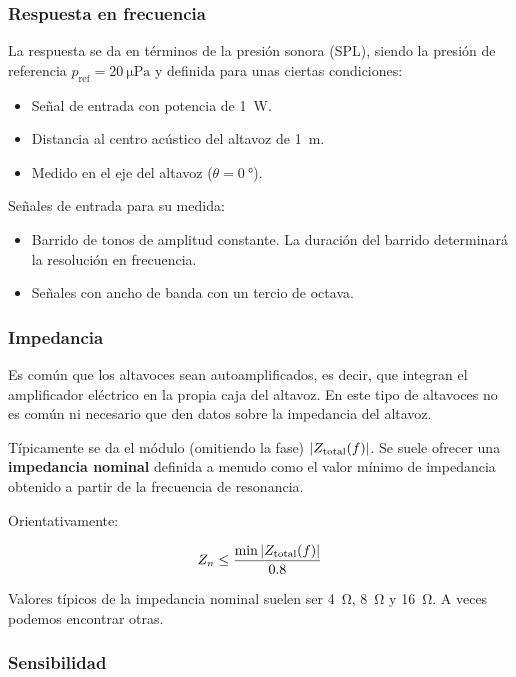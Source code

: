 \documentclass[12pt, a4paper]{article}
\begin{document}
\subsubsection{Respuesta en frecuencia}

La respuesta se da en términos de la presión sonora (SPL), siendo la presión de referencia $p _{\text{ref}} = \qty{20}{\micro\pascal}$ y definida para unas ciertas condiciones:
\begin{itemize}
    \item Señal de entrada con potencia de \qty{1}{\watt}.
    \item Distancia al centro acústico del altavoz de \qty{1}{\meter}.
    \item Medido en el eje del altavoz ($\theta = \qty{0}{\degree}$).
\end{itemize}

Señales de entrada para su medida:
\begin{itemize}
    \item Barrido de tonos de amplitud constante. La duración del barrido determinará la resolución en frecuencia.
    \item Señales con ancho de banda con un tercio de octava.
\end{itemize}

\subsubsection{Impedancia}

Es común que los altavoces sean autoamplificados, es decir, que integran el amplificador eléctrico en la propia caja del altavoz. En este tipo de altavoces no es común ni necesario que den datos sobre la impedancia del altavoz.

Típicamente se da el módulo (omitiendo la fase) $\abs{Z _{\text{total}}(f)}$. Se suele ofrecer una \textbf{impedancia nominal} definida a menudo como el valor mínimo de impedancia obtenido a partir de la frecuencia de resonancia.

Orientativamente:

\begin{equation} \label{eq:impedancia_nominal}
    Z _n \leq \frac{\min \abs{ Z _{\text{total}}(f)} }{0.8}
\end{equation}

Valores típicos de la impedancia nominal suelen ser \qty{4}{\ohm}, \qty{8}{\ohm} y \qty{16}{\ohm}. A veces podemos encontrar otras.

\subsubsection{Sensibilidad}
\end{document}
